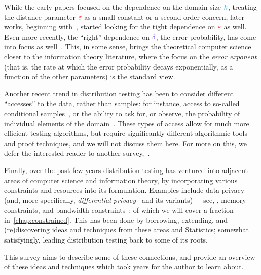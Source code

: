 While the early papers focused on the dependence on the domain size ${\textcolor{cyan}{k}}$, treating the distance parameter $\textcolor{red}{\varepsilon}$ as a small constant or a second-order concern, later works, beginning with~\citet{ChanDVV14}, started looking for the tight dependence on $\textcolor{red}{\varepsilon}$ as well. Even more recently, the ``right'' dependence on $\errprob$, the error probability, has come into focus as well~\citep{DiakonikolasGPP18,DiakonikolasGKP21}. This, in some sense, brings the theoretical computer science closer to the information theory literature, where the focus on the \emph{error exponent} (that is, the rate at which the error probability decays exponentially, as a function of the other parameters) is the standard view.

Another recent trend in distribution testing has been to consider different ``accesses'' to the data, rather than \iid samples: for instance, access to so-called conditional samples~\citep{CRS:15,CFGM:13}, or the ability to ask for, or observe, the probability of individual elements of the domain~\citep{RubinfeldS09,CanonneR14,OnakS18}. These types of access allow for much more efficient testing algorithms, but require significantly different algorithmic tools and proof techniques, and we will not discuss them here. For more on this, we defer the interested reader to another survey,~\citet{Canonne:15:Survey}.

Finally, over the past few years distribution testing has ventured into adjacent areas of computer science and information theory, by incorporating various constraints and resources into its formulation. Examples include data privacy (and, more specifically, \emph{differential privacy}~\citep{DworkMNS06} and its variants)~--~see, \eg \citep{KamathU20}, memory constraints, and bandwidth constraints~\citep{Tsitsiklis:93}; of which we will cover a fraction in~\cref{chap:constrained}. This has been done by borrowing, extending, and (re)discovering ideas and techniques from these areas and Statistics; somewhat satisfyingly, leading distribution testing back to some of its roots. 

This survey aims to describe some of these connections, and provide an overview of these ideas and techniques which took years for the author to learn about.
